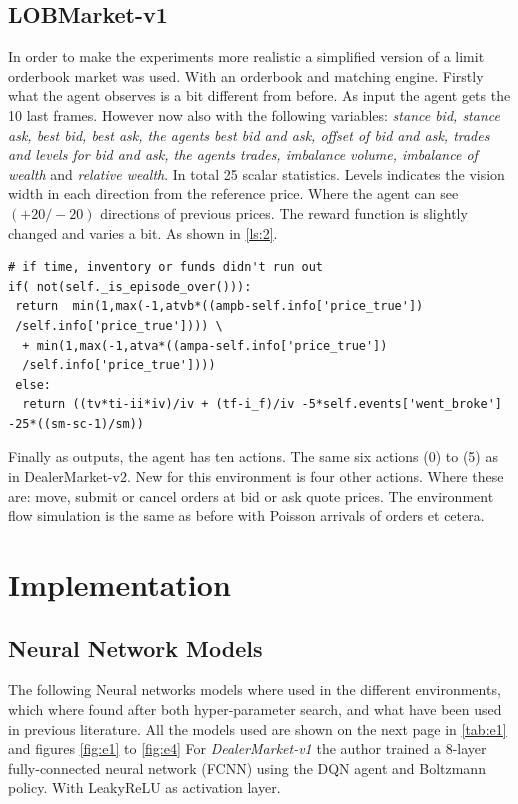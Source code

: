 \documentclass{kththesis}
\theoremstyle{definition}
\begin{document}
\subsection{LOBMarket-v1}
In order to make the experiments more realistic a simplified version of a limit orderbook market was used. With an orderbook and matching engine. Firstly what the agent observes is a bit different from before. As input the agent gets the 10 last frames. However now also with the following variables: \textit{stance bid, stance ask, best bid, best ask, the agents best bid and ask, offset of bid and ask,  trades and levels for bid and ask, the agents trades, imbalance volume, imbalance of wealth} and \textit{relative wealth}. 
\newline
\newline
In total 25 scalar statistics. Levels indicates the vision width in each direction from the reference price. Where the agent can see $(+20/-20)$ directions of previous prices. The reward function is slightly changed and varies a bit. As shown in \autoref{ls:2}.

\begin{lstlisting}[caption={Reward function for LOBMarket-v1},captionpos=b, label=ls:2]
# if time, inventory or funds didn't run out
if( not(self._is_episode_over())):
 return  min(1,max(-1,atvb*((ampb-self.info['price_true'])
 /self.info['price_true']))) \
  + min(1,max(-1,atva*((ampa-self.info['price_true'])
  /self.info['price_true']))) 
 else: 
  return ((tv*ti-ii*iv)/iv + (tf-i_f)/iv -5*self.events['went_broke'] -25*((sm-sc-1)/sm))
\end{lstlisting}
Finally as outputs, the agent has ten actions. The same six actions (0) to (5) as in DealerMarket-v2. New for this environment is four other actions. Where these are: move, submit or cancel orders at bid or ask quote prices. The environment flow simulation is the same as before with Poisson arrivals of orders et cetera.

\newpage
\section{Implementation}


\subsection{Neural Network Models}
The following Neural networks models where used in the different environments, which where found after both hyper-parameter search, and what have been used in previous literature. All the models used are shown on the next page in \autoref{tab:e1} and figures \autoref{fig:e1} to \autoref{fig:e4} For \textit{DealerMarket-v1} the author trained a 8-layer fully-connected neural network (FCNN) using the DQN agent and Boltzmann policy. With LeakyReLU as activation layer.
\end{document}

